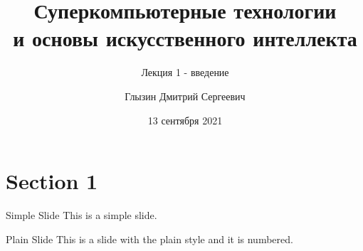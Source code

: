 \documentclass{beamer}
\title{Суперкомпьютерные технологии \\и основы искусственного интеллекта}
\subtitle{Лекция 1 - введение}
\author{Глызин Дмитрий Сергеевич}
\institute{Ярославский государственный \\университет им. П.Г. Демидова}
\date{13 сентября 2021}
\begin{document}

\begin{frame}
	\maketitle %
\end{frame}


\section{Section 1} %


\begin{frame}{Simple Slide}
	This is a simple slide.
\end{frame}


\begin{frame}[plain]{Plain Slide}
	This is a slide with the plain style and it is numbered.
\end{frame}

\end{document}
